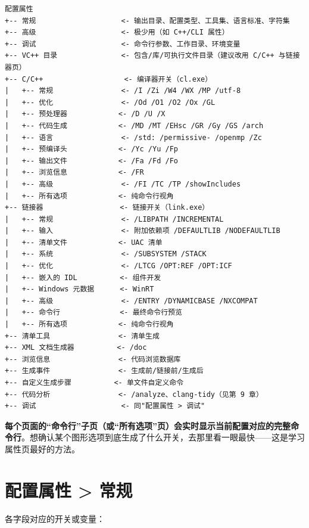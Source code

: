 \begin{lstlisting}[style=textstyle, breaklines=true]
配置属性
+-- 常规                    <- 输出目录、配置类型、工具集、语言标准、字符集
+-- 高级                    <- 极少用（如 C++/CLI 属性）
+-- 调试                    <- 命令行参数、工作目录、环境变量
+-- VC++ 目录               <- 包含/库/可执行文件目录（建议改用 C/C++ 与链接器页）
+-- C/C++                   <- 编译器开关（cl.exe）
|   +-- 常规                <- /I /Zi /W4 /WX /MP /utf-8
|   +-- 优化                <- /Od /O1 /O2 /Ox /GL
|   +-- 预处理器            <- /D /U /X
|   +-- 代码生成            <- /MD /MT /EHsc /GR /Gy /GS /arch
|   +-- 语言                <- /std: /permissive- /openmp /Zc
|   +-- 预编译头            <- /Yc /Yu /Fp
|   +-- 输出文件            <- /Fa /Fd /Fo
|   +-- 浏览信息            <- /FR
|   +-- 高级                <- /FI /TC /TP /showIncludes
|   +-- 所有选项            <- 纯命令行视角
+-- 链接器                  <- 链接开关（link.exe）
|   +-- 常规                <- /LIBPATH /INCREMENTAL
|   +-- 输入                <- 附加依赖项 /DEFAULTLIB /NODEFAULTLIB
|   +-- 清单文件            <- UAC 清单
|   +-- 系统                <- /SUBSYSTEM /STACK
|   +-- 优化                <- /LTCG /OPT:REF /OPT:ICF
|   +-- 嵌入的 IDL          <- 组件开发
|   +-- Windows 元数据      <- WinRT
|   +-- 高级                <- /ENTRY /DYNAMICBASE /NXCOMPAT
|   +-- 命令行              <- 最终命令行预览
|   +-- 所有选项            <- 纯命令行视角
+-- 清单工具                <- 清单生成
+-- XML 文档生成器          <- /doc
+-- 浏览信息                <- 代码浏览数据库
+-- 生成事件                <- 生成前/链接前/生成后
+-- 自定义生成步骤          <- 单文件自定义命令
+-- 代码分析                <- /analyze、clang-tidy（见第 9 章）
+-- 调试                    <- 同"配置属性 > 调试"
\end{lstlisting}

\begin{tipbox}[提示]
\textbf{每个页面的“命令行”子页（或“所有选项”页）会实时显示当前配置对应的完整命令行}。想确认某个图形选项到底生成了什么开关，去那里看一眼最快——这是学习属性页最好的方法。
\end{tipbox}

\section{配置属性 > 常规}

各字段对应的开关或变量：

